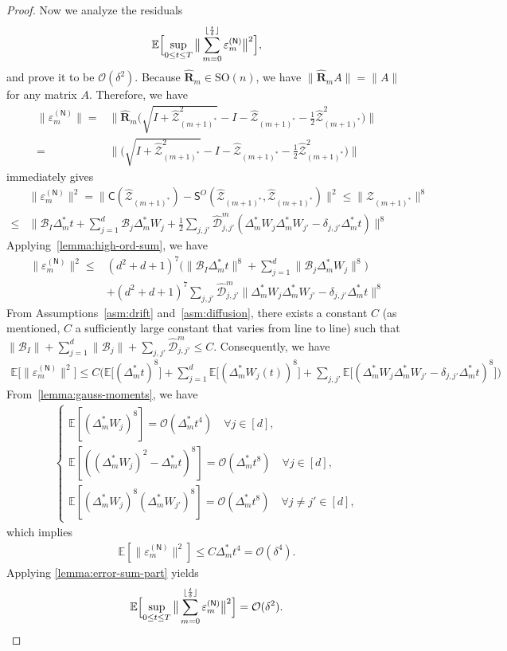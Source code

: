 \documentclass[11pt, a4paper, onecolumn]{article}
\newcommand{\SOn}{\mathrm{SO}(n)}
\newcommand{\E}{\mathbb{E}}
\newcommand{\m}{m}
\newcommand{\SSO}{\nm S^{O}}
\newcommand{\bfR}{\mathbf{R}}
\newcommand{\Z}{\mathcal{Z}}
\newcommand{\B}{\mathcal{B}}
\newcommand{\hatZ}{\widehat{\Z}}
\newcommand{\hatR}{\widehat{\bfR}}
\newcommand{\hatD}{\widehat{\tg D}}
\newcommand{\tg}[1]{\mathcal{#1}}
\newcommand{\nm}[1]{\mathsf{#1}}
\newcommand{\calO}{\mathcal{O}}
\newcommand{\mos}{{(m+1)^*}}
\newcommand{\Dms}{{\Delta^{*}_{m}}}
\newcommand{\hDjjpms}{ {\hatD_{j,j'}^{\m}} }
\newcommand{\sumub}{{\lfloor \frac{t}{\delta} \rfloor}}
\newcommand{\hZmos}{ \hatZ_{\mos} }
\newcommand{\half}{{\frac{1}{2}}}
\newcommand{\hRms}{{\hatR_\m}}
\newcommand{\ermn}[1]{\varepsilon_m^{(#1)}}
\newcommand{\EsupN}[1]{\E\Bigl[ \sup_{0 \le t\le T} \big\| \sum_{m=0}^{\sumub} #1 \big\|^2 \Bigr]}
\begin{document}
\begin{appendices}
\begin{proof}
Now we analyze the residuals
\begin{align*}
    \mathbb{E}\Bigl[ \sup_{0 \le t\le T} \big\| \sum_{m=0}^{\sumub} \ermn{\nm N} \big\|^2 \Bigr] , 
\end{align*}
and prove it to be $\calO(\delta^2)$. Because $\hatR_{m}\in\SOn$, we have $ \|\hatR_{m}A\|=\|A\|$ for any matrix $A$. Therefore, we have 
\begin{align*}
   \| \ermn{\nm N} \| = & \Big\|\hRms\Big(\sqrt{I+\hZmos^2} -I - \hZmos - \half  \hZmos^2\Big)\Big\| \\
                      = & \Big\|\Big(\sqrt{I+\hZmos^2} -I - \hZmos - \half  \hZmos^2\Big)\Big\| 
\end{align*}
 immediately gives 
\begin{align*}
  & \|\ermn{\nm N}\|^{2} = \|\nm C(\hZmos)- \SSO(\hZmos,\hZmos)\|^2 \le \|\hZmos\|^{8}  \\[3pt]
    \le & \Big\| \B_I \Dms t + \sum_{j=1}^d \B_j \Dms W_{j} + \half \sum_{j, j'} \hDjjpms ( \Dms W_j \Dms W_{j'} - \delta_{j,j'} \Dms t ) \Big\|^8 
\end{align*}
Applying~\cref{lemma:high-ord-sum}, we have
\begin{align*}
    \|\ermn{\nm N}\|^{2} \le &  (d^2+d+1)^7\Big( \| \B_I \Dms t\|^8 +  \sum_{j=1}^d \|\B_j \Dms W_{j}\|^8\Big) \\
    & + (d^2+d+1)^7 \sum_{j, j'} \hDjjpms  \Big\| \Dms W_j\Dms W_{j'} - \delta_{j,j'} \Dms t  \Big\|^8 
\end{align*}
From Assumptions~\ref{asm:drift} and~\ref{asm:diffusion}, there exists a constant $C$ (as mentioned, $C$  a sufficiently large constant that varies from line to line) such that $\| \B_I\|+\sum_{j=1}^d\|\B_j\|+ \sum_{j, j'} \hDjjpms \le C$. Consequently, we have
\begin{align*}
    \E\big[\|\ermn{\nm N}\|^{2}\big] \le   C \Big( \E\big[(\Dms t)^8\big] +  \sum_{j=1}^d  \E\big[(\Dms W_{j}(t))^8\big] +  \sum_{j, j'}  \E\big[( \Dms W_j\Dms W_{j'} - \delta_{j,j'} \Dms t )^8 \big]\Big)
\end{align*}
From~\cref{lemma:gauss-moments}, we have 
\begin{align*}
    \begin{cases}
        \mathbb E[(\Dms W_{j})^{8}]=\calO(\Dms t^4) \quad \forall j \in [d], \\
        \mathbb E[((\Dms W_{j})^{2}-\Dms t)^{8}] =\calO(\Dms t^8)  \quad \forall j \in [d], \\
        \mathbb E[(\Dms W_{j})^{8}(\Dms W_{j'})^{8}]=\calO(\Dms t^8) \quad \forall j \neq j' \in [d],
    \end{cases}
\end{align*} which implies
\begin{align*}
    \E[\|\ermn{\nm N}\|^2] \le C \Dms t^4= \calO(\delta^4).
\end{align*}
Applying \cref{lemma:error-sum-part} yields
\begin{align}\label{eq:app-B-combine-2}
   \EsupN{\ermn{\nm N}} =  \mathcal{O}(\delta^2).
\end{align}    


\end{proof}
\end{appendices}
\end{document}

